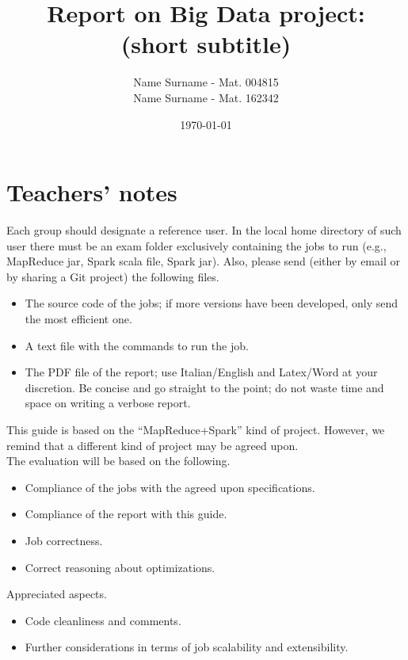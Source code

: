 \documentclass[10pt]{article}
\title{\textbf{Report on Big Data project: \\(short subtitle)}}
\author{
Name Surname - Mat. 004815\\
Name Surname - Mat. 162342}
\date{\today}
\begin{document}
    \maketitle
    \newpage

    \tableofcontents

    \newpage

    \section{Teachers' notes}

    Each group should designate a reference user. In the local home directory of such user there must be an {\sf exam} folder exclusively containing the jobs to run (e.g., MapReduce jar, Spark scala file, Spark jar). Also, please send (either by email or by sharing a Git project) the following files.

    \begin{itemize}
        \item The source code of the jobs; if more versions have been developed, only send the most efficient one.
        \item A text file with the commands to run the job.
        \item The PDF file of the report; use Italian/English and Latex/Word at your discretion. Be concise and go straight to the point; do not waste time and space on writing a verbose report.
    \end{itemize}

    This guide is based on the ``MapReduce+Spark'' kind of project. However, we remind that a different kind of project may be agreed upon.
    \\

    The evaluation will be based on the following.
    \begin{itemize}
        \item Compliance of the jobs with the agreed upon specifications.
        \item Compliance of the report with this guide.
        \item Job correctness.
        \item Correct reasoning about optimizations.
    \end{itemize}

    Appreciated aspects.
    \begin{itemize}
        \item Code cleanliness and comments.
        \item Further considerations in terms of job scalability and extensibility.
    \end{itemize}
\end{document}
